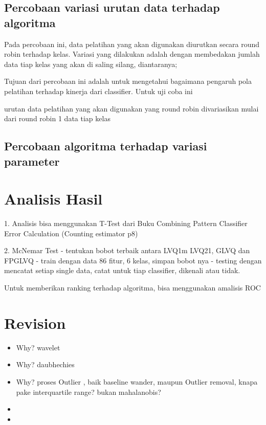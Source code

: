 \subsection{Percobaan variasi urutan data terhadap algoritma}
Pada percobaan ini, data pelatihan yang akan digunakan diurutkan secara
round robin terhadap kelas. Variasi yang dilakukan adalah dengan
membedakan jumlah data tiap kelas yang akan di saling silang, diantaranya;

Tujuan dari percobaan ini adalah untuk mengetahui bagaimana pengaruh pola
pelatihan terhadap kinerja dari classifier. Untuk uji coba ini 

urutan
data pelatihan yang akan digunakan yang round robin divariasikan mulai dari round robin 1 data tiap kelas

\subsection{Percobaan algoritma terhadap variasi parameter}

\section{Analisis Hasil}
1. Analisis bisa menggunakan T-Test dari 
Buku Combining Pattern Classifier
Error Calculation (Counting estimator p8)

2. McNemar Test
	- tentukan bobot terbaik antara LVQ1m LVQ21, GLVQ dan FPGLVQ
	- train dengan data 86 fitur, 6 kelas, simpan bobot nya
	- testing dengan mencatat setiap single data, catat untuk tiap classifier,
	dikenali atau tidak.


Untuk memberikan ranking terhadap algoritma, bisa menggunakan amalisis ROC 
\newpage
\section{Revision}
\begin{itemize}
  \item Why? wavelet
  \item Why? daubhechies
  \item Why? proses Outlier , baik baseline wander, maupun Outlier removal,
  knapa pake interquartile range? bukan mahalanobis?
  \item 
  \item 
\end{itemize}
